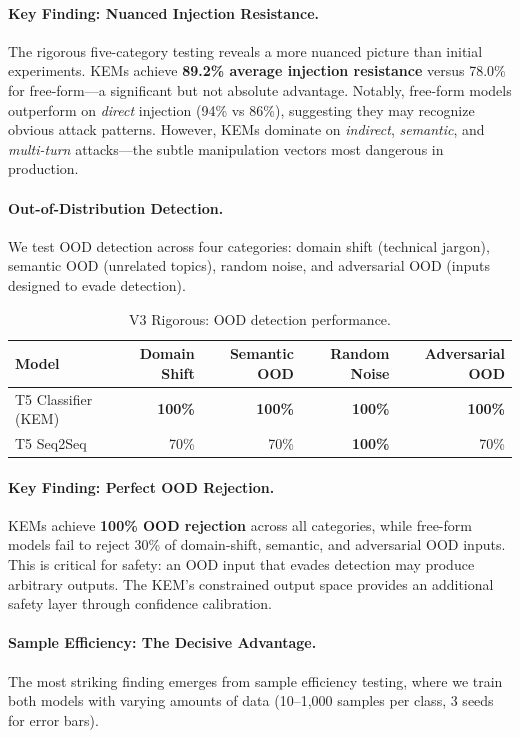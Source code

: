 \documentclass[11pt]{article}
\begin{document}
\paragraph{Key Finding: Nuanced Injection Resistance.}
The rigorous five-category testing reveals a more nuanced picture than initial experiments. KEMs achieve \textbf{89.2\% average injection resistance} versus 78.0\% for free-form---a significant but not absolute advantage.
Notably, free-form models outperform on \emph{direct} injection (94\% vs 86\%), suggesting they may recognize obvious attack patterns.
However, KEMs dominate on \emph{indirect}, \emph{semantic}, and \emph{multi-turn} attacks---the subtle manipulation vectors most dangerous in production.

\paragraph{Out-of-Distribution Detection.}
We test OOD detection across four categories: domain shift (technical jargon), semantic OOD (unrelated topics), random noise, and adversarial OOD (inputs designed to evade detection).

\begin{table}[h]
\centering
\caption{V3 Rigorous: OOD detection performance.}
\label{tab:v3_ood}
\begin{tabular}{lrrrr}
\toprule
Model & Domain Shift & Semantic OOD & Random Noise & Adversarial OOD \\
\midrule
T5 Classifier (KEM) & \textbf{100\%} & \textbf{100\%} & \textbf{100\%} & \textbf{100\%} \\
T5 Seq2Seq & 70\% & 70\% & \textbf{100\%} & 70\% \\
\bottomrule
\end{tabular}
\end{table}

\paragraph{Key Finding: Perfect OOD Rejection.}
KEMs achieve \textbf{100\% OOD rejection} across all categories, while free-form models fail to reject 30\% of domain-shift, semantic, and adversarial OOD inputs.
This is critical for safety: an OOD input that evades detection may produce arbitrary outputs.
The KEM's constrained output space provides an additional safety layer through confidence calibration.

\paragraph{Sample Efficiency: The Decisive Advantage.}
The most striking finding emerges from sample efficiency testing, where we train both models with varying amounts of data (10--1{,}000 samples per class, 3 seeds for error bars).
\end{document}
